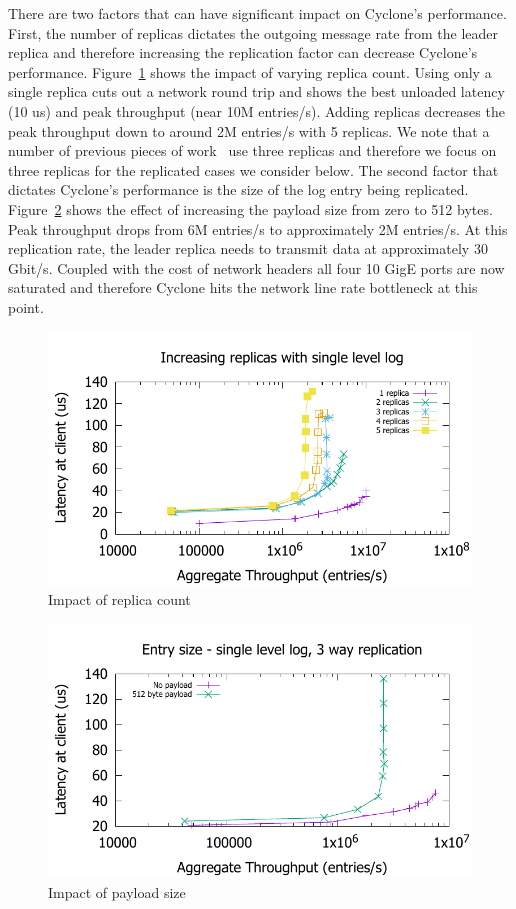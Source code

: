 \documentclass[pageno]{jpaper}
\begin{document}
There are two factors that can have significant impact on Cyclone's
performance. First, the number of replicas dictates the outgoing message rate
from the leader replica and therefore increasing the replication factor can
decrease Cyclone's performance. Figure~\ref{fig:replicas} shows the impact of
varying replica count. Using only a single replica cuts out a network round trip
and shows the best unloaded latency (10 us) and peak throughput (near 10M
entries/s). Adding replicas decreases the peak throughput down to around 2M
entries/s with 5 replicas. We note that a number of previous pieces of
work~\cite{faast, farm} use three replicas and therefore we focus on three
replicas for the replicated cases we consider below. The second factor that
dictates Cyclone's performance is the size of the log entry being
replicated. Figure~\ref{fig:payload} shows the effect of increasing the payload
size from zero to 512 bytes. Peak throughput drops from 6M entries/s to
approximately 2M entries/s. At this replication rate, the leader replica needs
to transmit data at approximately 30 Gbit/s. Coupled with the cost of network
headers all four 10 GigE ports are now saturated and therefore Cyclone hits the
network line rate bottleneck at this point.

\begin{figure}
\includegraphics[scale=0.6]{results2/replicas.pdf}
\caption{Impact of replica count}
\label{fig:replicas}
\end{figure}

\begin{figure}
\includegraphics[scale=0.6]{results2/512.pdf}
\caption{Impact of payload size}
\label{fig:payload}
\end{figure}
\end{document}
